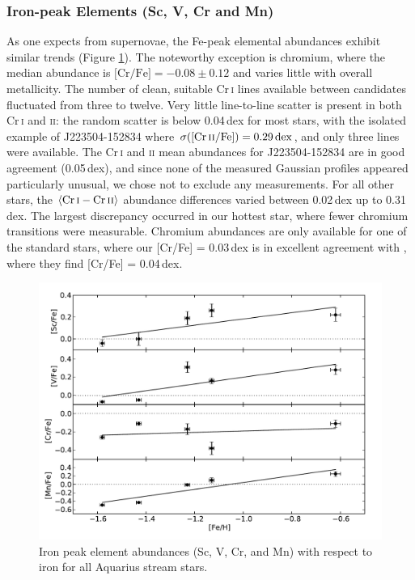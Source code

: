 \documentclass{emulateapj}
\begin{document}
\subsubsection{Iron-peak Elements (Sc, V, Cr and Mn)}
\label{sec:fe-peak-abundances}

As one expects from supernovae, the {Fe-peak} elemental abundances exhibit similar trends (Figure \ref{fig:fe-peak-elements}). The noteworthy exception is chromium, where the median abundance is {$\mbox{[Cr/Fe]} = -0.08 \pm 0.12$} and varies little with overall metallicity. The number of clean, suitable {Cr\,\textsc{i}} lines available between candidates fluctuated from three to twelve. Very little line-to-line scatter is present in both {Cr\,\textsc{i}} and \textsc{ii}: the random scatter is below {0.04\,dex} for most stars, with the isolated example of {J223504-152834} where ${\sigma(\mbox{[Cr\,\textsc{ii}/Fe]}) = 0.29\,{\rm dex}}$, and only three lines were available. The {Cr\,\textsc{i}} and \textsc{ii} mean abundances for {J223504-152834} are in good agreement (0.05\,dex), and since none of the measured Gaussian profiles appeared particularly unusual, we chose not to exclude any measurements. For all other stars, the ${\langle{\rm Cr}\,\textsc{i} - {\rm Cr}\,\textsc{ii}\rangle}$ abundance differences varied between {0.02\,dex} up to {0.31\,dex}. The largest discrepancy occurred in our hottest star, where fewer chromium transitions were measurable. Chromium abundances are only available for one of the standard stars, where our {[Cr/Fe] = 0.03}\,dex is in excellent agreement with \citet{fulbright_2000}, where they find {[Cr/Fe] = 0.04}\,dex.

\begin{figure}[h]
	\includegraphics[width=\columnwidth]{./figures/aquarius-fe-peak.pdf}
	\caption{Iron peak element abundances (Sc, V, Cr, and Mn) with respect to iron for all Aquarius stream stars.}
	\label{fig:fe-peak-elements}
\end{figure}
\end{document}
